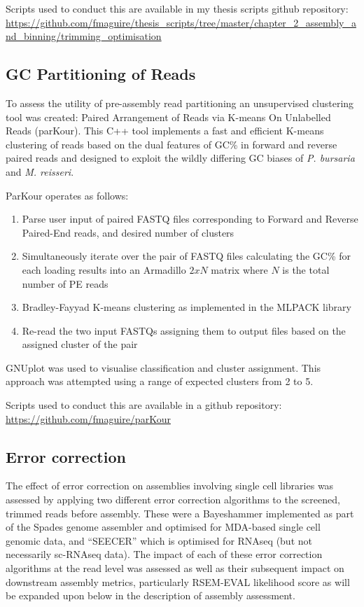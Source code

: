 Scripts used to conduct this are available in my thesis scripts github repository:
\url{https://github.com/fmaguire/thesis_scripts/tree/master/chapter_2_assembly_and_binning/trimming_optimisation}

\subsection{GC Partitioning of Reads}

To assess the utility of pre-assembly read partitioning an unsupervised clustering tool was created:
Paired Arrangement of Reads via K-means On Unlabelled Reads (parKour).
This C++ tool implements a fast and efficient K-means clustering of reads based on the dual features
of GC\% in forward and reverse paired reads and designed to exploit the wildly differing GC
biases of \textit{P. bursaria} and \textit{M. reisseri}.

ParKour operates as follows:
\begin{enumerate}
    \item Parse user input of paired FASTQ files corresponding to Forward and Reverse Paired-End reads, and desired number of clusters
    \item Simultaneously iterate over the pair of FASTQ files calculating the GC\% for each loading results into an Armadillo \(2xN\) matrix \citep{Sanderson2010} where \(N\) is the total number of PE reads
    \item Bradley-Fayyad K-means \citep{Bradley1998} clustering as implemented in the MLPACK library \citep{mlpack2013}
    \item Re-read the two input FASTQs assigning them to output files based on the assigned cluster of the pair
\end{enumerate}

GNUplot \citep{Gnuplot_4.4} was used to visualise classification and cluster assignment.
This approach was attempted using a range of expected clusters from 2 to 5.

Scripts used to conduct this are available in a github repository:
\url{https://github.com/fmaguire/parKour}

\subsection{Error correction}

The effect of error correction on assemblies involving single cell libraries was assessed 
by applying two different error correction algorithms to the screened, trimmed reads before assembly.
These were a Bayeshammer \citep{Nikolenko2013} implemented as part of the Spades 
genome assembler \citep{Bankevich2012} and optimised for MDA-based single cell genomic data, 
and ``SEECER'' \citep{Le2013} which is optimised for RNAseq (but not necessarily sc-RNAseq
data). 
The impact of each of these error correction algorithms at the read level was assessed as well 
as their subsequent impact on downstream assembly metrics, particularly RSEM-EVAL likelihood score
as will be expanded upon below in the description of assembly assessment.

